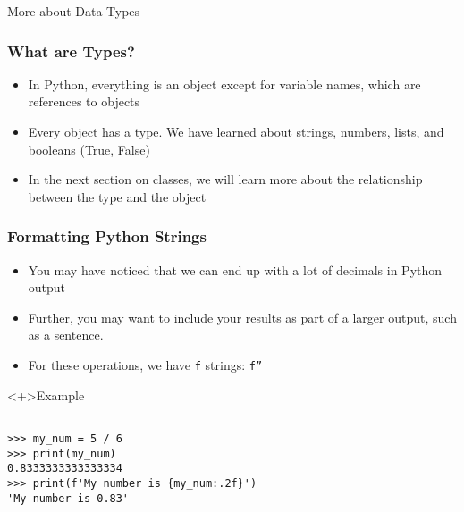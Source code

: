 \documentclass[handout, 11pt]{beamer}
\begin{document}
\begin{section}{More about Data Types}
\begin{frame}
\frametitle{What are Types?}
\begin{itemize}
\item In Python, everything is an object except for variable names, which are references to objects
\vfill
\item Every object has a type. We have learned about strings, numbers, lists, and booleans (True, False)
\vfill
\item In the next section on classes, we will learn more about the relationship between the type and the object
\end{itemize}
\end{frame}
\begin{frame}[fragile]
\frametitle{Formatting Python Strings}
\begin{itemize}
\item You may have noticed that we can end up with a lot of decimals in Python output
\vfill
\item Further, you may want to include your results as part of a larger output, such as a sentence.
\vfill
\item For these operations, we have \texttt{f} strings: \texttt{f''}
\end{itemize}
\begin{block}<+>{Example}
\begin{verbatim}

>>> my_num = 5 / 6
>>> print(my_num)
0.8333333333333334
>>> print(f'My number is {my_num:.2f}')
'My number is 0.83'


\end{verbatim}
\end{block}
\end{frame}
\end{section}
\end{document}
